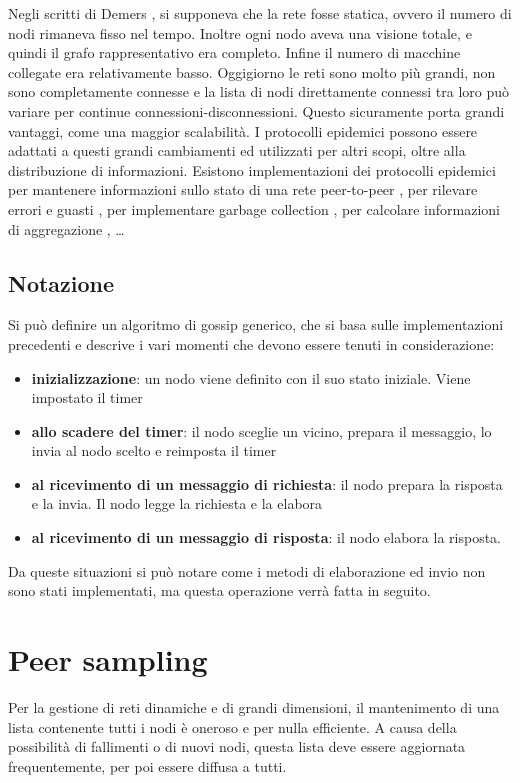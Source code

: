 Negli scritti di Demers \cite{demers}, si supponeva che la rete fosse statica, ovvero il numero di nodi rimaneva fisso nel tempo. Inoltre ogni nodo aveva una visione totale, e quindi il grafo rappresentativo era completo. Infine il numero di macchine collegate era relativamente basso.
Oggigiorno le reti sono molto più grandi, non sono completamente connesse e la lista di nodi direttamente connessi tra loro può variare per continue connessioni-disconnessioni. Questo sicuramente porta grandi vantaggi, come una maggior scalabilità. I protocolli epidemici possono essere adattati a questi grandi cambiamenti ed utilizzati per altri scopi, oltre alla distribuzione di informazioni. Esistono implementazioni dei protocolli epidemici per mantenere informazioni sullo stato di una rete peer-to-peer \cite{newscast}, per rilevare errori e guasti \cite{swim}, per implementare garbage collection \cite{garbage_collection}, per calcolare informazioni di aggregazione \cite{aggregation}, …
\subsection{Notazione}

Si può definire un algoritmo di gossip generico, che si basa sulle implementazioni precedenti e descrive i vari momenti che devono essere tenuti in considerazione:
\begin{itemize}
    \item \textbf{inizializzazione}: un nodo viene definito con il suo stato iniziale. Viene impostato il timer
    \item \textbf{allo scadere del timer}: il nodo sceglie un vicino, prepara il messaggio, lo invia al nodo scelto e reimposta il timer
    \item \textbf{al ricevimento di un messaggio di richiesta}: il nodo prepara la risposta e la invia. Il nodo legge la richiesta e la elabora
    \item \textbf{al ricevimento di un messaggio di risposta}: il nodo elabora la risposta.
\end{itemize}

Da queste situazioni si può notare come i metodi di elaborazione ed invio non sono stati implementati, ma questa operazione verrà fatta in seguito. 

\section{Peer sampling}

Per la gestione di reti dinamiche e di grandi dimensioni, il mantenimento di una lista contenente tutti i nodi è oneroso e per nulla efficiente. A causa della possibilità di fallimenti o di nuovi nodi, questa lista deve essere aggiornata frequentemente, per poi essere diffusa a tutti. 

